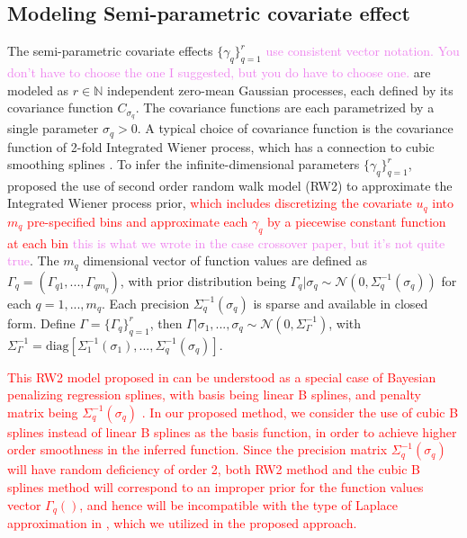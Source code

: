 \documentclass[ba]{imsart}
\newcommand{\highlight}[1]{\textcolor{red}{#1}}
\newcommand{\alex}[1]{\textcolor{violet}{{ }#1}}
\begin{document}
\subsection{Modeling Semi-parametric covariate effect}\label{subsec:smooth}

The semi-parametric covariate effects $\{\gamma_q\}_{q=1}^{r}$\alex{use consistent vector notation. You don't have to choose the one I suggested, but you do have to choose one.} are modeled as $r\in\mathbb{N}$ independent zero-mean Gaussian processes, each defined by its covariance function $C_{\sigma_{q}}$. The covariance functions are each parametrized by a single parameter $\sigma_q > 0$. A typical choice of covariance function is the covariance function of 2-fold Integrated Wiener process\citep{wiener}, which has a connection to cubic smoothing splines \citep{wahbaprior}.
To infer the infinite-dimensional parameters $\{\gamma_q\}_{q=1}^{r}$, \cite{rw2} proposed the use of second order random walk model (RW2) to approximate the Integrated Wiener process prior, \highlight{which includes discretizing the covariate $u_q$ into $m_q$ pre-specified bins and approximate each $\gamma_q$ by a piecewise constant function at each bin}\alex{this is what we wrote in the case crossover paper, but it's not quite true}. The $m_q$ dimensional vector of function values are defined as $\Gamma_q = (\Gamma_{q1}, ..., \Gamma_{qm_q})$, with prior distribution being $\Gamma_q|\sigma_q \sim \mathcal{N}(0,\Sigma_q^{-1}(\sigma_q))$ for each $q = 1,...,m_q$. Each precision $\Sigma_q^{-1}(\sigma_q)$ is sparse and available in closed form. Define $\Gamma = \{\Gamma_q\}_{q=1}^{r}$, then $\Gamma|\sigma_1,...,\sigma_q \sim \mathcal{N}(0,\Sigma_\Gamma^{-1})$, with $\Sigma_\Gamma^{-1} = \text{diag}[\Sigma_1^{-1}(\sigma_1), ..., \Sigma_q^{-1}(\sigma_q)]$.

\highlight{This RW2 model proposed in \cite{rw2} can be understood as a special case of Bayesian penalizing regression splines, with basis being linear B splines, and penalty matrix being $\Sigma_q^{-1}(\sigma_q)$ \citep{SPDEandPspline}. In our proposed method, we consider the use of cubic B splines instead of linear B splines as the basis function, in order to achieve higher order smoothness in the inferred function. Since the precision matrix $\Sigma_q^{-1}(\sigma_q)$ will have random deficiency of order 2, both RW2 method and the cubic B splines method will correspond to an improper prior for the function values vector $\Gamma_q()$, and hence will be incompatible with the type of Laplace approximation in \cite{tierney}, which we utilized in the proposed approach.}
\end{document}
